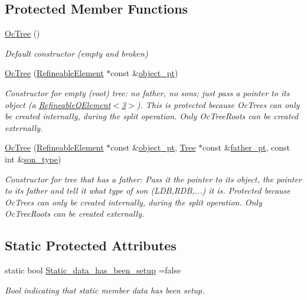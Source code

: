 \subsection*{Protected Member Functions}
\begin{DoxyCompactItemize}
\item 
\hyperlink{classoomph_1_1OcTree_abb830075e2f08aa68bf65a07089039ca}{Oc\+Tree} ()
\begin{DoxyCompactList}\small\item\em Default constructor (empty and broken) \end{DoxyCompactList}\item 
\hyperlink{classoomph_1_1OcTree_a2c0f7987566846a0451bdc1ed522a2d4}{Oc\+Tree} (\hyperlink{classoomph_1_1RefineableElement}{Refineable\+Element} $\ast$const \&\hyperlink{classoomph_1_1Tree_a2f2eeb0f1dd161f696cccc652974ff4c}{object\+\_\+pt})
\begin{DoxyCompactList}\small\item\em Constructor for empty (root) tree\+: no father, no sons; just pass a pointer to its object (a \hyperlink{classoomph_1_1RefineableQElement_3_013_01_4}{Refineable\+Q\+Element$<$3$>$}). This is protected because Oc\+Trees can only be created internally, during the split operation. Only Oc\+Tree\+Roots can be created externally. \end{DoxyCompactList}\item 
\hyperlink{classoomph_1_1OcTree_af79e3cbf9d0c65f9e4a01207d65d4967}{Oc\+Tree} (\hyperlink{classoomph_1_1RefineableElement}{Refineable\+Element} $\ast$const \&\hyperlink{classoomph_1_1Tree_a2f2eeb0f1dd161f696cccc652974ff4c}{object\+\_\+pt}, \hyperlink{classoomph_1_1Tree}{Tree} $\ast$const \&\hyperlink{classoomph_1_1Tree_a5f8444ddeda272b70669b8bbe929708a}{father\+\_\+pt}, const int \&\hyperlink{classoomph_1_1Tree_a7537f8fe7c896d2220eb2da03567b34d}{son\+\_\+type})
\begin{DoxyCompactList}\small\item\em Constructor for tree that has a father\+: Pass it the pointer to its object, the pointer to its father and tell it what type of son (L\+DB,R\+DB,...) it is. Protected because Oc\+Trees can only be created internally, during the split operation. Only Oc\+Tree\+Roots can be created externally. \end{DoxyCompactList}\end{DoxyCompactItemize}
\subsection*{Static Protected Attributes}
\begin{DoxyCompactItemize}
\item 
static bool \hyperlink{classoomph_1_1OcTree_addaa397d11580ec949531c8ae9b082a5}{Static\+\_\+data\+\_\+has\+\_\+been\+\_\+setup} =false
\begin{DoxyCompactList}\small\item\em Bool indicating that static member data has been setup. \end{DoxyCompactList}\end{DoxyCompactItemize}
